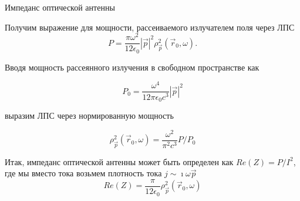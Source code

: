\documentclass[9pt, compress, xcolor=table]{beamer}
\begin{document}
\begin{frame}{Импеданс оптической антенны}

Получим выражение для мощности, рассеиваемого излучателем поля через ЛПС
\begin{equation*}
P =\frac{\pi \omega^2}{12 \epsilon_0}|\vec p|^2 \rho_{\vec p}^2(\vec r_0, \omega).
\end{equation*}

Вводя мощность рассеянного излучения в свободном пространстве как

\begin{equation*}
P_0 =\frac{\omega^4}{12 \pi \epsilon_0 c^3}|\vec p|^2
\end{equation*}

выразим ЛПС через нормированную мощность

\begin{equation*}
\rho_{\vec p}^2(\vec r_0, \omega) =\frac{\omega^2}{\pi^2 c^3}P/P_0
\end{equation*}

Итак, импеданс оптической антенны может быть определен как $Re(Z)=P/I^2$, где мы
вместо тока возьмем плотность тока $j \sim \imath \omega \vec p$
\begin{equation*}
\boxed{Re(Z) = \frac{\pi}{12 \epsilon_0}\rho_{\vec p}^2(\vec r_0, \omega)}
\end{equation*}
\end{frame}
\end{document}
